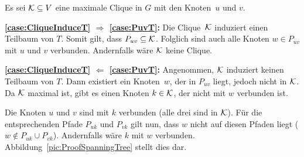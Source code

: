 \begin{Proof}
    Es sei $\mathcal{K} \subseteq V$ eine maximale Clique in $G$ mit den Knoten~$u$ und $v$.
    
    \textbf{\boldmath\ref{case:CliqueInduceT} $\Rightarrow$ \ref{case:PuvT}:} Die Clique~$\mathcal{K}$ induziert einen Teilbaum von $T$. Somit gilt, dass $P_{uv} \subseteq \mathcal{K}$. Folglich sind auch alle Knoten $w \in P_{uv}$ mit $u$ und $v$ verbunden. Andernfalls wäre $\mathcal{K}$ keine Clique.
    
    \textbf{\boldmath\ref{case:CliqueInduceT} $\Leftarrow$ \ref{case:PuvT}:} Angenommen, $\mathcal{K}$ induziert keinen Teilbaum von $T$. Dann existiert ein Knoten~$w$, der in $P_{uv}$ liegt, jedoch nicht in $\mathcal{K}$. Da $\mathcal{K}$ maximal ist, gibt es einen Knoten $k \in \mathcal{K}$, der nicht mit $w$ verbunden ist.
    
    Die Knoten $u$ und $v$ sind mit $k$ verbunden (alle drei sind in $\mathcal{K}$). Für die entsprechenden Pfade $P_{uk}$ und $P_{vk}$ gilt nun, dass $w$ nicht auf diesen Pfaden liegt ($w \notin P_{uk} \cup P_{vk}$). Andernfalls wäre $k$ mit $w$ verbunden. Abbildung~\ref{pic:ProofSpanningTree} stellt dies dar.
    
    \begin{figure}[htbp]
        \centering
\end{figure}
\end{Proof}
